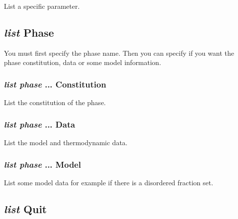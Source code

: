 \documentclass[12pt]{article}
\begin{document}
List a specific parameter.

\subsection{{\em list} Phase}

You must first specify the phase name.  Then you can specify if you
want the phase constitution, data or some model information.

\subsubsection{{\em list phase} ... Constitution}

List the constitution of the phase.

\subsubsection{{\em list phase} ... Data}

List the model and thermodynamic data.

\subsubsection{{\em list phase} ... Model}

List some model data for example if there is a disordered fraction set.

\subsection{{\em list} Quit}
\end{document}
